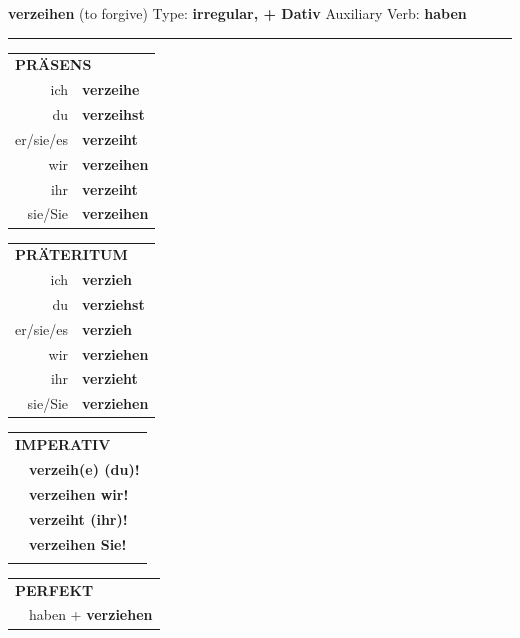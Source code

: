 \documentclass[10pt,a4paper]{revtex4-2}
\begin{document}
\begin{verbbox-dat}
    {\Large \bf verzeihen} (to forgive) \hfill Type: \textbf{irregular, + Dativ} \hfill Auxiliary Verb: \textbf{haben} 
    
     \vspace{5pt}

    \hrule
    
    \vspace{5pt}

  \begin{tabular}{rl}
     \multicolumn{2}{l}{\textbf{PRÄSENS} }\\
    ich & \textbf{verzeihe}\\
    du & \textbf{verzeihst}\\
    er/sie/es & \textbf{verzeiht}\\
    wir & \textbf{verzeihen}\\
    ihr & \textbf{verzeiht}\\
    sie/Sie & \textbf{verzeihen}\\
  \end{tabular}
  \hfill
     \begin{tabular}{rl}
    \multicolumn{2}{l}{\textbf{PRÄTERITUM} }\\
    ich & \textbf{verzieh}\\
    du & \textbf{verziehst}\\
    er/sie/es & \textbf{verzieh}\\
    wir & \textbf{verziehen}\\
    ihr & \textbf{verzieht}\\
    sie/Sie & \textbf{verziehen}\\
  \end{tabular}
  \hfill
  \begin{tabular}{rl}
     \multicolumn{2}{l}{\textbf{IMPERATIV} }\\
   & \textbf{verzeih(e) (du)!}\\
   & \textbf{verzeihen wir!}\\
   & \textbf{verzeiht (ihr)!}\\
   & \textbf{verzeihen Sie!}\\
   & \vspace{10pt}
  \end{tabular}

    \vspace{10pt}

 \begin{tabular}{rl}
     \multicolumn{2}{l}{\textbf{PERFEKT}}\\
   & haben + \textbf{verziehen}\\
  \end{tabular}
\hfill
   \begin{tabular}{rl}
   

\end{tabular}
\end{verbbox-dat}
\end{document}
